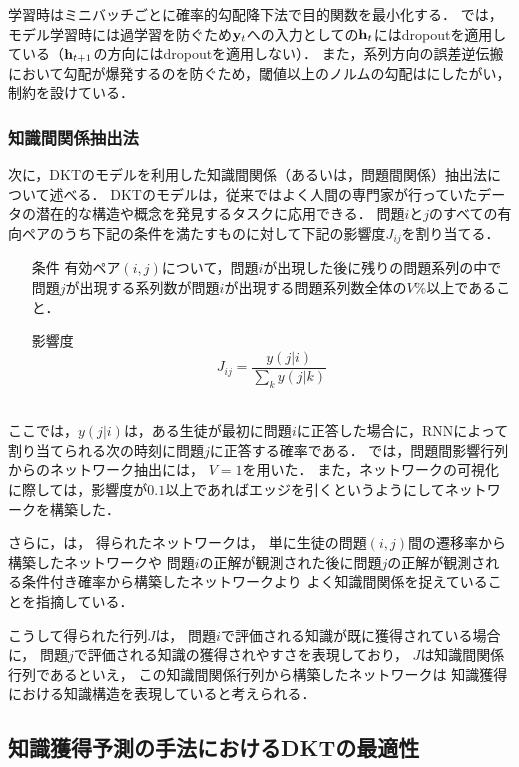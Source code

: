 学習時はミニバッチごとに確率的勾配降下法で目的関数を最小化する．
\cite{piech2015deep}では，モデル学習時には過学習を防ぐため${\bf y}_t$への入力としての${\bf h}_t$にはdropout\cite{srivastava2014dropout}を適用している（${\bf h}_{t+1}$の方向にはdropoutを適用しない）．
また，系列方向の誤差逆伝搬\cite{werbos1990backpropagation}において勾配が爆発するのを防ぐため，閾値以上のノルムの勾配は\cite{pascanu2013difficulty}にしたがい，制約を設けている．


\subsubsection{知識間関係抽出法}
次に，DKTのモデルを利用した知識間関係（あるいは，問題間関係）抽出法について述べる．
DKTのモデルは，従来ではよく人間の専門家が行っていたデータの潜在的な構造や概念を発見するタスクに応用できる．
問題$i$と$j$のすべての有向ペアのうち下記の条件を満たすものに対して下記の影響度$J_{ij}$を割り当てる．\\
\begin{itemize}
	\item [条件]有効ペア$(i, j)$について，問題$i$が出現した後に残りの問題系列の中で問題$j$が出現する系列数が問題$i$が出現する問題系列数全体の$V\%$以上であること．
	\item[影響度]
$$J_{ij} = \frac{y(j|i)}{\sum_k y(j|k)}$$\\
\end{itemize}
ここでは，$y(j|i)$は，ある生徒が最初に問題$i$に正答した場合に，RNNによって割り当てられる次の時刻に問題$j$に正答する確率である．
\cite{piech2015deep}では，問題間影響行列からのネットワーク抽出には，
$V=1$を用いた．
また，ネットワークの可視化に際しては，影響度が$0.1$以上であればエッジを引くというようにしてネットワークを構築した．

さらに，\cite{piech2015deep}は，
得られたネットワークは，
単に生徒の問題$(i, j)$間の遷移率から構築したネットワークや
問題$i$の正解が観測された後に問題$j$の正解が観測される条件付き確率から構築したネットワークより
よく知識間関係を捉えていることを指摘している．


こうして得られた行列$J$は，
問題$i$で評価される知識が既に獲得されている場合に，
問題$j$で評価される知識の獲得されやすさを表現しており，
$J$は知識間関係行列であるといえ，
この知識間関係行列から構築したネットワークは
知識獲得における知識構造を表現していると考えられる．


\subsection{知識獲得予測の手法におけるDKTの最適性}

